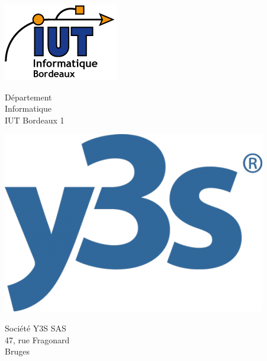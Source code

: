 \documentclass[a4paper,12pt]{book}
\begin{document}

\begin{titlepage}
\centering
\sffamily

\begin{minipage}[b]{0.25\linewidth}
  \includegraphics[width=\linewidth]{logo_dut}
  \par\vspace{2mm}
  \small
  Département\\
  Informatique\\
  IUT Bordeaux 1
\end{minipage}
\hspace{0.25\linewidth}
\begin{minipage}[b]{0.25\linewidth}
  \includegraphics[width=\linewidth]{logo_y3s}
  \par\vspace{2mm}
  \small
  Société Y3S SAS\\
  47, rue Fragonard\\
  Bruges
\end{minipage}


\end{titlepage}
\end{document}
